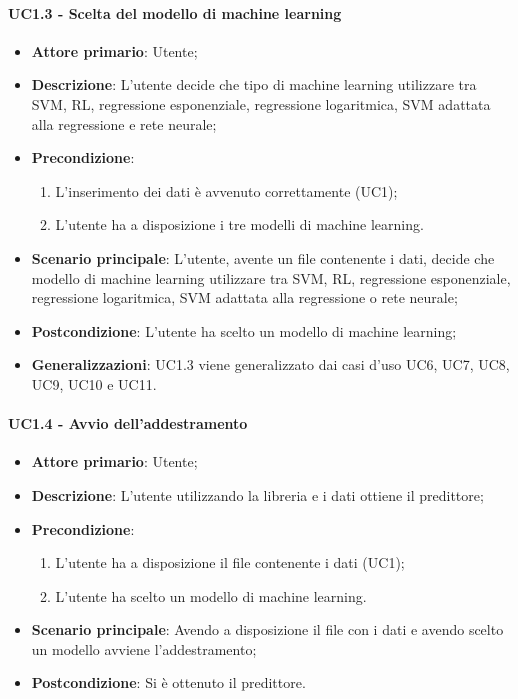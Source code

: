 \paragraph{UC1.3 - Scelta del modello di machine learning}%
\label{para:uc1.3}
\begin{itemize}
  \item \textbf{Attore primario}: Utente;
  \item \textbf{Descrizione}: L'utente decide che tipo di machine learning utilizzare tra SVM, RL, regressione esponenziale, regressione logaritmica, SVM adattata alla regressione e rete neurale;
  \item \textbf{Precondizione}:
  \begin{enumerate}
    \item L'inserimento dei dati è avvenuto correttamente (UC1);
    \item L'utente ha a disposizione i tre modelli di machine learning.
  \end{enumerate}
  \item \textbf{Scenario principale}: L'utente, avente un file contenente i dati, decide che modello di machine learning utilizzare tra SVM, RL, regressione esponenziale, regressione logaritmica, SVM adattata alla regressione o rete neurale;
  \item \textbf{Postcondizione}: L'utente ha scelto un modello di machine learning;
  \item \textbf{Generalizzazioni}: UC1.3 viene generalizzato dai casi d'uso UC6, UC7, UC8, UC9, UC10 e UC11.
\end{itemize}

\paragraph{UC1.4 - Avvio dell'addestramento}
\label{para:uc1.4}
\begin{itemize}
  \item \textbf{Attore primario}: Utente;
  \item \textbf{Descrizione}: L'utente utilizzando la libreria e i dati ottiene il predittore;
  \item \textbf{Precondizione}:
  \begin{enumerate}
    \item L'utente ha a disposizione il file contenente i dati (UC1);
    \item L'utente ha scelto un modello di machine learning.
  \end{enumerate}
  \item \textbf{Scenario principale}: Avendo a disposizione il file con i dati e avendo scelto un modello avviene l'addestramento;
  \item \textbf{Postcondizione}: Si è ottenuto il predittore.
\end{itemize}

